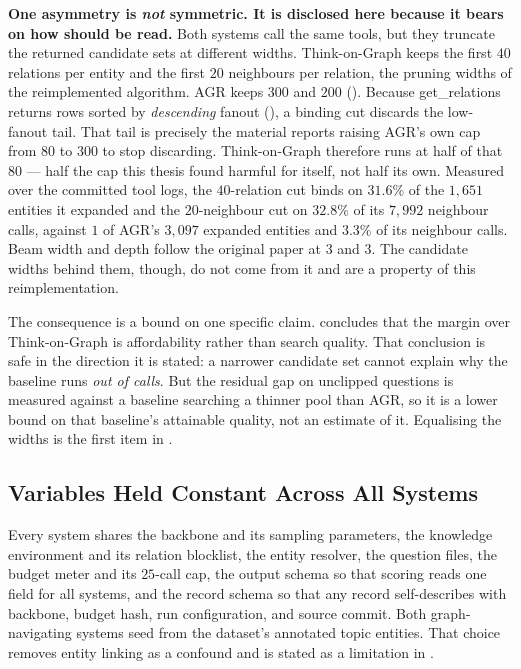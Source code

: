 \textbf{One asymmetry is \emph{not} symmetric. It is disclosed here because
it bears on how  should be read.} Both systems call the same
tools, but they truncate the returned candidate sets at different widths.
Think-on-Graph keeps the first $40$ relations per entity and the first $20$
neighbours per relation, the pruning widths of the reimplemented algorithm. AGR
keeps $300$ and $200$ (). Because \textsf{get\_relations}
returns rows sorted by \emph{descending} fanout (), a binding
cut discards the low-fanout tail. That tail is precisely the material
 reports raising AGR's own cap from $80$ to $300$ to stop
discarding. Think-on-Graph therefore runs at half of that $80$ --- half the cap
this thesis found harmful for itself, not half its own. Measured over the
committed tool logs, the $40$-relation cut binds on $31.6\%$ of the $1{,}651$
entities it expanded and the $20$-neighbour cut on $32.8\%$ of its $7{,}992$
neighbour calls, against $1$ of AGR's $3{,}097$ expanded entities and $3.3\%$ of
its neighbour calls. Beam width and depth follow the original paper at $3$ and
$3$. The candidate widths behind them, though, do not come from it and are a
property of this reimplementation.

The consequence is a bound on one specific claim.  concludes
that the margin over Think-on-Graph is affordability rather than search quality.
That conclusion is safe in the direction it is stated: a narrower candidate
set cannot explain why the baseline runs \emph{out of calls}. But the
residual gap on unclipped questions is measured against a baseline searching a
thinner pool than AGR, so it is a lower bound on that baseline's attainable
quality, not an estimate of it. Equalising the widths is the first item in
.

\subsection{Variables Held Constant Across All
Systems}\label{sec:baseline-constants}

Every system shares the backbone and its sampling parameters, the knowledge
environment and its relation blocklist, the entity resolver, the question files,
the budget meter and its $25$-call cap, the output schema so that scoring reads
one field for all systems, and the record schema so that any record
self-describes with backbone, budget hash, run configuration, and source commit.
Both graph-navigating systems seed from the dataset's annotated topic entities.
That choice removes entity linking as a confound and is stated as a limitation
in .


